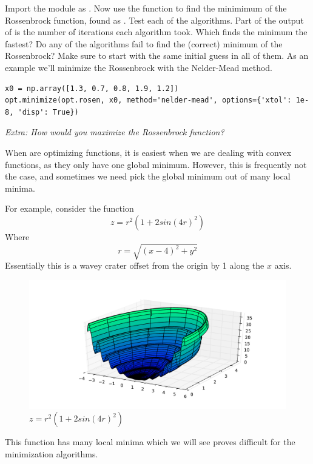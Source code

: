 \begin{problem}

Import the  module as . Now use the  function to find the minimimum of the Rossenbrock function, found as . Test each of the algorithms. Part of the output of  is the number of iterations each algorithm took. Which finds the minimum the fastest? Do any of the algorithms fail to find the (correct) minimum of the Rossenbrock?
Make sure to start with the same initial guess in all of them. As an example we'll minimize the Rossenbrock with the Nelder-Mead method.

\begin{lstlisting}
x0 = np.array([1.3, 0.7, 0.8, 1.9, 1.2])
opt.minimize(opt.rosen, x0, method='nelder-mead', options={'xtol': 1e-8, 'disp': True})
\end{lstlisting}

\emph{Extra: How would you maximize the Rossenbrock function?}
\end{problem}

When are optimizing functions, it is easiest when we are dealing with convex functions, as they only have one global minimum. However, this is frequently not the case, and sometimes we need pick the global minimum out of many local minima.

For example, consider the function
\[
z = r^2 (1+ 2sin(4r)^2)
\]
Where
\[
r = \sqrt{(x-4)^2 + y^2}
\]
Essentially this is a wavey crater offset from the origin by 1 along the $x$ axis.
\begin{figure}
\includegraphics[width=\textwidth]{ManyMinima.pdf}
\caption{$z = r^2 (1+ 2sin(4r)^2)$}
\label{opt:muiltmin}
\end{figure}
This function has many local minima which we will see proves difficult for the minimization algorithms.

